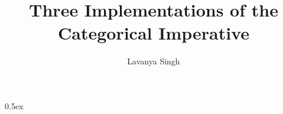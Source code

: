 \documentclass[11pt,a4paper]{article}
\begin{document}
\title{Three Implementations of the Categorical Imperative}
\author{Lavanya Singh}
\maketitle

\tableofcontents

\newpage

\parindent 0pt\parskip 0.5ex








\newpage




\end{document}
